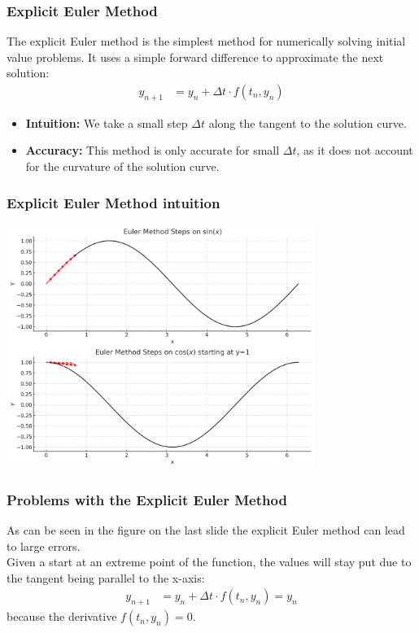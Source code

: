 \documentclass{beamer}
\begin{document}
\begin{frame}
  \frametitle{Explicit Euler Method}
  The explicit Euler method is the simplest method for numerically solving initial value problems. It uses a simple forward difference to approximate the next solution:
  \begin{align*}
    y_{n + 1} &= y_n + \Delta t \cdot f(t_n, y_n)
  \end{align*}
  \begin{itemize}
    \item \textbf{Intuition:} We take a small step $\Delta t$ along the tangent to the solution curve.
    \item \textbf{Accuracy:} This method is only accurate for small $\Delta t$, as it does not account for the curvature of the solution curve.
  \end{itemize}
\end{frame}
\begin{frame}
    \frametitle{Explicit Euler Method intuition }
    \vspace{-5mm}
    \begin{center}
        \includegraphics[width=0.75\textwidth]{examples/fig/euler.png}
    \end{center}
\end{frame}
\begin{frame}
    \frametitle{Problems with the Explicit Euler Method}
    As can be seen in the figure on the last slide the explicit Euler method can lead to large errors.\\
    \vspace{5mm}
    Given a start at an extreme point of the function, the values will stay put due to the tangent being parallel to the x-axis: 
    \begin{align*}
        y_{n + 1} &= y_n + \Delta t \cdot f(t_n, y_n) = y_n
    \end{align*}
    because the derivative $ f(t_n, y_n) = 0 $.
\end{frame}
\end{document}
